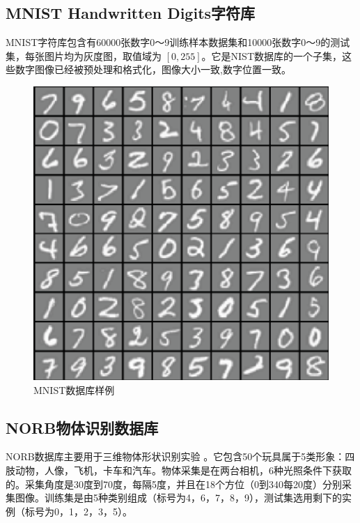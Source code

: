 \documentclass[oneside]{ZJUthesis}
\begin{document}
\subsection{MNIST Handwritten Digits字符库}
MNIST字符库包含有60000张数字0～9训练样本数据集和10000张数字0～9的测试集，每张图片均为灰度图，取值域为 $[0,255]$\cite{lecun1998gradient}。它是NIST数据库的一个子集，这些数字图像已经被预处理和格式化，图像大小一致,数字位置一致。
\begin{figure}[H]
\centering
\includegraphics[scale=0.5]{./Pictures/mnist-icon.eps}
\caption{MNIST数据库样例\label{fig:mnist-icon}}
\end{figure}



\subsection{NORB物体识别数据库}
NORB数据库主要用于三维物体形状识别实验 \cite{DBLP:conf/cvpr/LeCunHB04}。它包含50个玩具属于5类形象：四肢动物，人像，飞机，卡车和汽车。物体采集是在两台相机，6种光照条件下获取的。采集角度是30度到70度，每隔5度，并且在18个方位（0到340每20度）分别采集图像。训练集是由5种类别组成（标号为4，6，7，8，9），测试集选用剩下的实例（标号为0，1，2，3，5）。
\end{document}
